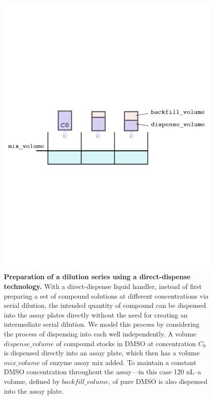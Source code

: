 \documentclass[aps,pre,twocolumn,nofootinbib,superscriptaddress,linenumbers]{revtex4-1}
\begin{document}
\begin{figure}[tb]
    \includegraphics[trim={0 9cm 0 9cm},clip,width=\columnwidth]{../figures/direct_dispense.pdf}

  \caption{{\bf Preparation of a dilution series using a direct-dispense technology.}
  With a direct-dispense liquid handler, instead of first preparing a set of compound solutions at different concentrations via serial dilution, the intended quantity of compound can be dispensed into the assay plates directly without the need for creating an intermediate serial dilution.
  We model this process by considering the process of dispensing into each well independently.
  A volume $dispense\_volume$ of compound stocks in DMSO at concentration $C_0$ is dispensed directly into an assay plate, which then has a volume $mix\_volume$ of enzyme assay mix added.
  To maintain a constant DMSO concentration throughout the assay---in this case 120 nL--a volume, defined by $backfill\_volume$, of pure DMSO is also dispensed into the assay plate.
  }
  \label{fig:direct_dispense}
\end{figure}
\end{document}

